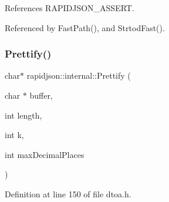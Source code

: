 References R\+A\+P\+I\+D\+J\+S\+O\+N\+\_\+\+A\+S\+S\+E\+RT.



Referenced by Fast\+Path(), and Strtod\+Fast().

\mbox{\label{namespacerapidjson_1_1internal_a7865c7734bca9cbbf66bdc7c0d164a77}} 
\subsubsection{\texorpdfstring{Prettify()}{Prettify()}}
{\footnotesize\ttfamily char$\ast$ rapidjson\+::internal\+::\+Prettify (\begin{DoxyParamCaption}\item[{char $\ast$}]{buffer,  }\item[{int}]{length,  }\item[{int}]{k,  }\item[{int}]{max\+Decimal\+Places }\end{DoxyParamCaption})}



Definition at line 150 of file dtoa.\+h.


